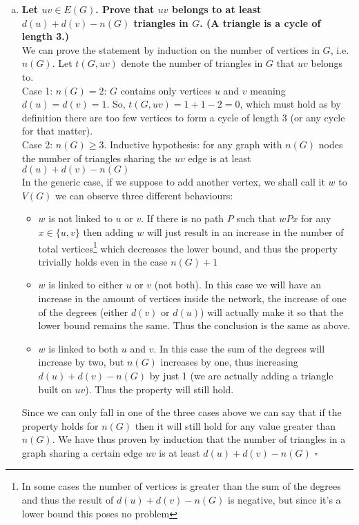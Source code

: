 \begin{enumerate}[a)]
    \boldmath
    \item \textbf{Let $uv \in E(G)$. Prove that $uv$ belongs to at least $d(u)+d(v)-n(G)$ triangles in $G$. (A triangle is a cycle of length 3.)} 
    \unboldmath
    \\
    \linebreak 
    We can prove the statement by induction on the number of vertices in $G$, i.e. $n(G)$. Let $t(G, uv)$ denote the number of triangles in $G$ that $uv$ belongs to. \\
    \linebreak 
    Case 1: $n(G) = 2$: $G$ contains only vertices $u$ and $v$ meaning $d(u) = d(v) = 1$. So, $t(G, uv) = 1 + 1 - 2 = 0$, which must hold as by definition there are too few vertices to form a cycle of length 3 (or any cycle for that matter). \\
    \linebreak 
    Case 2: $n(G) \geq 3$. Inductive hypothesis: for any graph with $n(G)$ nodes the number of triangles sharing the $uv$ edge is at least $d(u)+d(v)-n(G)$\\
    \linebreak
    In the generic case, if we suppose to add another vertex, we shall call it $w$ to $V(G)$ we can observe three different behaviours:
    \begin{itemize}
        \item $w$ is not linked to $u$ or $v$. If there is no path $P$ such that $wPx$ for any $x \in \{u, v\}$ then adding $w$ will just result in an increase in the number of total vertices\footnote{In some cases the number of vertices is greater than the sum of the degrees and thus the result of $d(u)+d(v)-n(G)$ is negative, but since it's a lower bound this poses no problem} which decreases the lower bound, and thus the property trivially holds even in the case $n(G) + 1$
        \item $w$ is linked to either $u$ or $v$ (not both). In this case we will have an increase in the amount of vertices inside the network, the increase of one of the degrees (either $d(v)$ or $d(u)$) will actually make it so that the lower bound remains the same. Thus the conclusion is the same as above.
        \item $w$ is linked to both $u$ and $v$. In this case the sum of the degrees will increase by two, but $n(G)$ increases by one, thus increasing $d(u)+d(v)-n(G)$ by just 1 (we are actually adding a triangle built on $uv$). Thus the property will still hold.
    \end{itemize}
    Since we can only fall in one of the three cases above we can say that if the property holds for $n(G)$ then it will still hold for any value greater than $n(G)$. We have thus proven by induction that the number of triangles in a graph sharing a certain edge $uv$ is at least $d(u)+d(v)-n(G)$ \hspace{10mm} $\square$ \\
\end{enumerate}